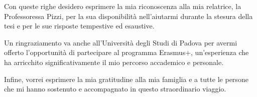 
Con queste righe desidero esprimere la mia riconoscenza alla mia relatrice, la Professoressa Pizzi, per la sua disponibilità nell'aiutarmi durante la stesura della tesi e per le sue risposte tempestive ed esaustive.

\vspace{5px}

Un ringraziamento va anche all'Università degli Studi di Padova per avermi offerto l'opportunità di partecipare al programma Erasmus+, un'esperienza che ha arricchito significativamente il mio percorso accademico e personale.

\vspace{5px}

Infine, vorrei esprimere la mia gratitudine alla mia famiglia e a tutte le persone che mi hanno sostenuto e accompagnato in questo straordinario viaggio.
